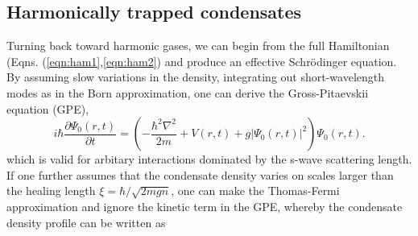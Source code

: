 

	
	
	
	\subsection*{Harmonically trapped condensates}

	Turning back toward harmonic gases, we can begin from the full Hamiltonian (Eqns.
	(\ref{eqn:ham1},\ref{eqn:ham2}) and produce an effective Schr\"{o}dinger equation.
	By assuming slow variations in the density, integrating out short-wavelength modes as in the Born approximation, one can derive the Gross-Pitaevskii equation (GPE),
	\begin{equation}
		i\hbar\frac{\partial \Psi_0(r,t)}{\partial t} = \left(-\frac{\hbar^2\nabla^2}{2m} + V(r,t) + g|\Psi_0(r,t)|^2\right)\Psi_0(r,t).
		\label{eqn:GPE}
	\end{equation}
	which is valid for arbitary interactions dominated by the s-wave scattering length.
	 If one further assumes that the condensate density varies on scales larger than the healing length $\xi = \hbar/\sqrt{2mgn}$, one can make the Thomas-Fermi approximation and ignore the kinetic term in the GPE, whereby the condensate density profile can be written as

